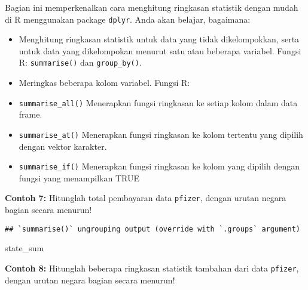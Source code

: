 \documentclass[
]{book}
\newenvironment{Shaded}{\begin{snugshade}}{\end{snugshade}}
\newcommand{\DataTypeTok}[1]{\textcolor[rgb]{0.13,0.29,0.53}{#1}}
\newcommand{\KeywordTok}[1]{\textcolor[rgb]{0.13,0.29,0.53}{\textbf{#1}}}
\newcommand{\NormalTok}[1]{#1}
\newcommand{\OperatorTok}[1]{\textcolor[rgb]{0.81,0.36,0.00}{\textbf{#1}}}
\newcommand{\StringTok}[1]{\textcolor[rgb]{0.31,0.60,0.02}{#1}}
\providecommand{\tightlist}{%
  \setlength{\itemsep}{0pt}\setlength{\parskip}{0pt}}
\begin{document}
Bagian ini memperkenalkan cara menghitung ringkasan statistik dengan mudah di R menggunakan package \texttt{dplyr}. Anda akan belajar, bagaimana:

\begin{itemize}
\tightlist
\item
  Menghitung ringkasan statistik untuk data yang tidak dikelompokkan, serta untuk data yang dikelompokan menurut satu atau beberapa variabel. Fungsi R: \texttt{summarise()} dan \texttt{group\_by()}.
\item
  Meringkas beberapa kolom variabel. Fungsi R:
\item
  \texttt{summarise\_all()} Menerapkan fungsi ringkasan ke setiap kolom dalam data frame.
\item
  \texttt{summarise\_at()} Menerapkan fungsi ringkasan ke kolom tertentu yang dipilih dengan vektor karakter.
\item
  \texttt{summarise\_if()} Menerapkan fungsi ringkasan ke kolom yang dipilih dengan fungsi yang menampilkan TRUE
\end{itemize}

\textbf{Contoh 7:} Hitunglah total pembayaran data \texttt{pfizer}, dengan urutan negara bagian secara menurun!

\begin{Shaded}
\end{Shaded}

\begin{verbatim}
## `summarise()` ungrouping output (override with `.groups` argument)
\end{verbatim}

\begin{Shaded}
\begin{Highlighting}[]
\NormalTok{state_sum}
\end{Highlighting}
\end{Shaded}

\textbf{Contoh 8:} Hitunglah beberapa ringkasan statistik tambahan dari data \texttt{pfizer}, dengan urutan negara bagian secara menurun!
\end{document}
